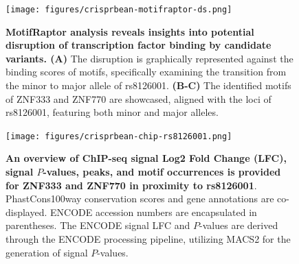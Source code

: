 \documentclass[a4paper, titlepage, openright]{book}
\newcommand{\motifraptor}{MotifRaptor\xspace}
\begin{document}
\begin{figure}[!]
	\centering
	\texttt{[image: figures/crisprbean-motifraptor-ds.png]}
	\caption[\motifraptor analysis reveals insights into potential disruption of transcription factor binding by candidate variants]{\textbf{\motifraptor analysis reveals insights into potential disruption of transcription factor binding by candidate variants. (A)} The disruption is graphically represented against the binding scores of motifs, specifically examining the transition from the minor to major allele of rs8126001. \textbf{(B-C)} The identified motifs of ZNF333 and ZNF770 are showcased, aligned with the loci of rs8126001, featuring both minor and major alleles.}
	\label{fig:crisprbean-motifraptor-ds}
\end{figure}

\begin{figure}[!]
	\centering
	\texttt{[image: figures/crisprbean-chip-rs8126001.png]}
	\caption[An overview of ChIP-seq signal Log2 Fold Change (LFC), signal $P$-values, peaks, and motif occurrences is provided for ZNF333 and ZNF770 in proximity to rs8126001]{\textbf{An overview of ChIP-seq signal Log2 Fold Change (LFC), signal $P$-values, peaks, and motif occurrences is provided for ZNF333 and ZNF770 in proximity to rs8126001}. PhastCons100way conservation scores and gene annotations are co-displayed. ENCODE accession numbers are encapsulated in parentheses. The ENCODE signal LFC and $P$-values are derived through the ENCODE processing pipeline, utilizing MACS2 \citep{zhang2008model} for the generation of signal $P$-values.}
	\label{fig:crisprbean-chip-variant}
\end{figure} 

\end{document}
